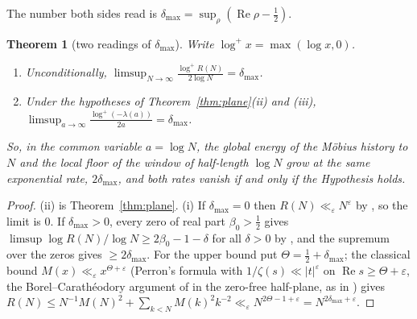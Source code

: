 \documentclass[11pt]{article}
\newtheorem{theorem}{Theorem}[section]
\theoremstyle{definition}
\theoremstyle{remark}
\DeclareMathOperator{\Ree}{Re}
\begin{document}
The number both sides read is $\delta_{\max}=\sup_\rho(\Ree\rho-\tfrac12)$.

\begin{theorem}[two readings of $\delta_{\max}$]\label{thm:tworeadings}
Write $\log^+x=\max(\log x,0)$.
\begin{enumerate}
\item[(i)] Unconditionally, $\displaystyle\limsup_{N\to\infty}\frac{\log^+R(N)}{2\log N}=\delta_{\max}$.
\item[(ii)] Under the hypotheses of Theorem~\ref{thm:plane}(ii) and (iii), $\displaystyle\limsup_{a\to\infty}\frac{\log^+(-\lambda(a))}{2a}=\delta_{\max}$.
\end{enumerate}
So, in the common variable $a=\log N$, the global energy of the M\"obius history to $N$ and the local floor of the window of half-length $\log N$ grow at the same exponential rate, $2\delta_{\max}$, and both rates vanish if and only if the Hypothesis holds.
\end{theorem}
\begin{proof}
(ii) is Theorem~\ref{thm:plane}. (i) If $\delta_{\max}=0$ then $R(N)\ll_\varepsilon N^\varepsilon$ by \cite[Theorem~12.6(iii)]{michaels-mobius}, so the limit is $0$. If $\delta_{\max}>0$, every zero of real part $\beta_0>\tfrac12$ gives $\limsup\log R(N)/\log N\ge2\beta_0-1-\delta$ for all $\delta>0$ by \cite[(47)]{michaels-mobius}, and the supremum over the zeros gives $\ge2\delta_{\max}$. For the upper bound put $\Theta=\tfrac12+\delta_{\max}$; the classical bound $M(x)\ll_\varepsilon x^{\Theta+\varepsilon}$ (Perron's formula with $1/\zeta(s)\ll|t|^\varepsilon$ on $\Ree s\ge\Theta+\varepsilon$, the Borel--Carath\'eodory argument of \cite[\S14.2]{titchmarsh} in the zero-free half-plane, as in \cite[\S14.25]{titchmarsh}) gives $R(N)\le N^{-1}M(N)^2+\sum_{k<N}M(k)^2k^{-2}\ll_\varepsilon N^{2\Theta-1+\varepsilon}=N^{2\delta_{\max}+\varepsilon}$.
\end{proof}
\end{document}
